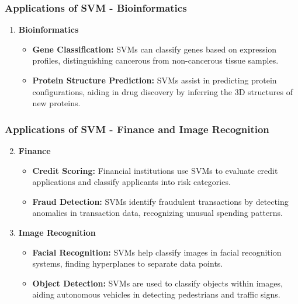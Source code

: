 \documentclass{beamer}
\begin{document}
\begin{frame}[fragile]
    \frametitle{Applications of SVM - Bioinformatics}
    \begin{enumerate}
        \item \textbf{Bioinformatics}
        \begin{itemize}
            \item \textbf{Gene Classification:} SVMs can classify genes based on expression profiles, distinguishing cancerous from non-cancerous tissue samples.
            \item \textbf{Protein Structure Prediction:} SVMs assist in predicting protein configurations, aiding in drug discovery by inferring the 3D structures of new proteins.
        \end{itemize}
    \end{enumerate}
\end{frame}

\begin{frame}[fragile]
    \frametitle{Applications of SVM - Finance and Image Recognition}
    \begin{enumerate}
        \setcounter{enumi}{1}
        \item \textbf{Finance}
        \begin{itemize}
            \item \textbf{Credit Scoring:} Financial institutions use SVMs to evaluate credit applications and classify applicants into risk categories.
            \item \textbf{Fraud Detection:} SVMs identify fraudulent transactions by detecting anomalies in transaction data, recognizing unusual spending patterns.
        \end{itemize}
        
        \item \textbf{Image Recognition}
        \begin{itemize}
            \item \textbf{Facial Recognition:} SVMs help classify images in facial recognition systems, finding hyperplanes to separate data points.
            \item \textbf{Object Detection:} SVMs are used to classify objects within images, aiding autonomous vehicles in detecting pedestrians and traffic signs.
        \end{itemize}
    \end{enumerate}
\end{frame}
\end{document}
